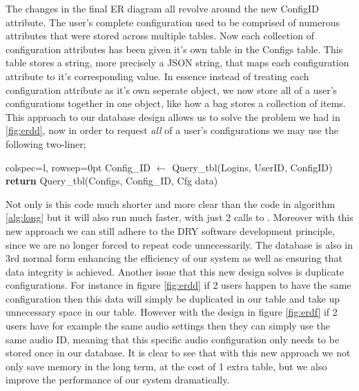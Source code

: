 The changes in the final ER diagram all revolve around the new
ConfigID attribute. The user's complete configuration used to 
be comprised of numerous attributes that were stored across
multiple tables. Now each collection of configuration
attributes has been given it's own table in the
{\sffamily Configs} table. This table stores a string, more 
precisely a JSON string, that maps each configuration
attribute to it's corresponding value. In essence instead of 
treating each configuration attribute as it's own seperate
object, we now store all of a user's configurations together
in one object, like how a bag stores a collection of items. 
This approach to our database design allows us to solve the 
problem we had in \ref{fig:erdd}, now in order to request 
\textit{all} of a user's configurations we may use the 
following two-liner;\\

\begin{center}
\begin{tblr}{colspec={l}, rowsep=0pt}
  {\sffamily Config\_ID} $\gets$ {\sffamily Query\_tbl(Logins, UserID, ConfigID)}\\
  {\sffamily \textbf{return} Query\_tbl(Configs, Config\_ID, Cfg data)}\\
\end{tblr}
\end{center}

Not only is this code much shorter and more clear than the 
code in algorithm \ref{alg:long} but it will also run much
faster, with just 2 calls to . Moreover
with this new approach we can still adhere to the DRY software
development principle, since we are no longer forced to repeat
code unnecessarily. The database is also in 3rd normal form
enhancing the efficiency of our system as 
well as ensuring that data integrity is achieved.
Another issue that this new design solves
is duplicate configurations. For instance in figure 
\ref{fig:erdd} if 2 users happen to have the same
configuration then this data will simply be duplicated in our 
table and take up unnecessary space in our table. However 
with the design in figure \ref{fig:erdf} if 2 users have for
example the same audio settings then they can simply use the
same audio ID, meaning that this specific audio configuration 
only needs to be stored once in our database. It is clear to 
see that with this new approach we not only save memory in 
the long term, at the cost of 1 extra table, but we also 
improve the performance of our system dramatically. \\
\vspace{0.2cm}

